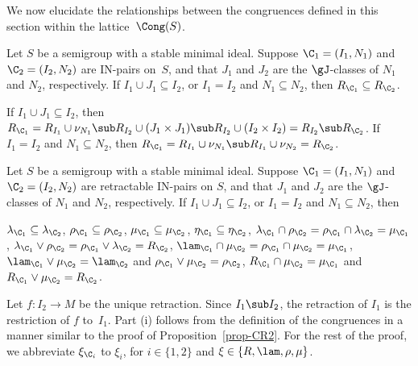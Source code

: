 We now elucidate the relationships between the congruences defined in this section within the lattice~$\Cong(S)$.

\begin{prop}
\label{prop-CR2}
Let $S$ be a semigroup with a stable minimal ideal.  Suppose $\C_1=(I_1,N_1)$ and ${\C_2=(I_2, N_2)}$ are IN-pairs on~$S$, and that $J_1$ and $J_2$ are the $\gJ$-classes of $N_1$
  and $N_2$, respectively. If $I_1\cup J_1\subseteq I_2$, or $I_1=I_2$ and
  $N_1\subseteq N_2$, then $R_{\C_1}\subseteq R_{\C_2}$.
\end{prop}

\pf  If $I_1\cup J_1\subseteq I_2$, then $R_{\C_1}=R_{I_1}\cup \nu_{N_1} \sub R_{I_2}\cup(J_1\times J_1)\sub R_{I_2}\cup(I_2\times I_2)=R_{I_2}\sub R_{\C_2}$.  
%
If $I_1=I_2$ and $N_1\subseteq N_2$, then $R_{\C_1}=R_{I_1}\cup\nu_{N_1}\sub R_{I_1}\cup\nu_{N_2}=R_{\C_2}$.
\epf



\begin{prop}
\label{prop-CR3}
Let $S$ be a semigroup with a stable minimal ideal.  Suppose $\C_1=(I_1,N_1)$ and ${\C_2=(I_2, N_2)}$ are retractable IN-pairs on $S$, and that $J_1$ and $J_2$ are the $\gJ$-classes of $N_1$ and $N_2$, respectively. If $I_1\cup J_1\subseteq I_2$, or $I_1=I_2$ and $N_1\subseteq N_2$, then
\begin{itemize}
\begin{multicols}{2}
 $\lambda_{\C_1}\subseteq \lambda_{\C_2}$,
$\rho_{\C_1}\subseteq \rho_{\C_2}$,
$\mu_{\C_1}\subseteq \mu_{\C_2}$,
$\eta_{\C_1}\subseteq \eta_{\C_2}$,
 $\lambda_{\C_1}\cap \rho_{\C_2}=\rho_{\C_1}\cap \lambda_{\C_2}=\mu_{\C_1}$, 
 $\lambda_{\C_1}\vee \rho_{\C_2}=\rho_{\C_1}\vee \lambda_{\C_2}=R_{\C_2}$,
 $\lam_{\C_1}\cap\mu_{\C_2} = \rho_{\C_1}\cap\mu_{\C_2} = \mu_{\C_1}$,
 $\lam_{\C_1}\vee\mu_{\C_2} = \lam_{\C_2}$ and $\rho_{\C_1}\vee\mu_{\C_2} = \rho_{\C_2}$,
 $R_{\C_1}\cap\mu_{\C_2}=\mu_{\C_1}$ and $R_{\C_1}\vee\mu_{\C_2}=R_{\C_2}$.
\end{multicols}
\end{itemize}
\end{prop}

\pf
Let $f:I_2\to M$ be the unique retraction.  Since $I_1\sub
  I_2$, the retraction of $I_1$ is the restriction of $f$ to~$I_1$.
  Part (i) follows from the definition of the congruences in a manner
  similar to the proof of Proposition~\ref{prop-CR2}.  For the rest of the proof, we abbreviate $\xi_{\C_i}$ to $\xi_i$, for $i\in\{1,2\}$ and $\xi\in\{R,\lam,\rho,\mu\}$.

